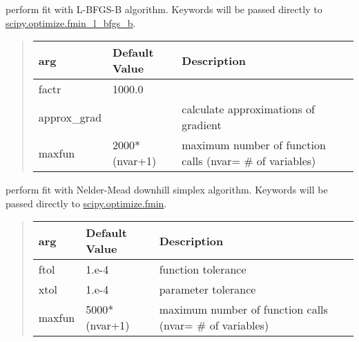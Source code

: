 \documentclass[letterpaper,10pt,english]{sphinxmanual}
\begin{document}

\begin{fulllineitems}
\label{fitting:lbfgsb}
perform fit with L-BFGS-B algorithm.  Keywords will be passed directly to
\href{http://docs.scipy.org/doc/scipy/reference/generated/scipy.optimize.fmin\_l\_bfgs\_b.html}{scipy.optimize.fmin\_l\_bfgs\_b}.
\begin{quote}

\begin{tabulary}{\linewidth}{|L|L|L|}
\hline
\textbf{
{\hyperref[fitting:lbfgsb]{}}
arg
} & \textbf{
Default Value
} & \textbf{
Description
}\\\hline

factr
 & 
1000.0
 & \\\hline

approx\_grad
 & 
 & 
calculate approximations of gradient
\\\hline

maxfun
 & 
2000*(nvar+1)
 & 
maximum number of function calls (nvar= \# of variables)
\\\hline
\end{tabulary}

\end{quote}

\end{fulllineitems}


\begin{fulllineitems}
\label{fitting:fmin}
perform fit with Nelder-Mead downhill simplex algorithm.  Keywords will be passed directly to
\href{http://docs.scipy.org/doc/scipy/reference/generated/scipy.optimize.fmin.html}{scipy.optimize.fmin}.
\begin{quote}

\begin{tabulary}{\linewidth}{|L|L|L|}
\hline
\textbf{
{\hyperref[fitting:fmin]{}}
arg
} & \textbf{
Default Value
} & \textbf{
Description
}\\\hline

ftol
 & 
1.e-4
 & 
function tolerance
\\\hline

xtol
 & 
1.e-4
 & 
parameter tolerance
\\\hline

maxfun
 & 
5000*(nvar+1)
 & 
maximum number of function calls (nvar= \# of variables)
\\\hline
\end{tabulary}

\end{quote}

\end{fulllineitems}
\end{document}
